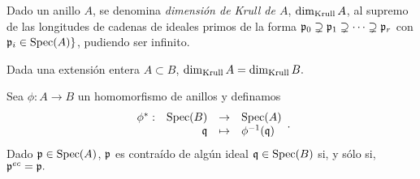 \documentclass[../main.tex]{subfiles}
\begin{document}
\begin{definition}
Dado un anillo $A$, se denomina \textit{dimensión de Krull de $A$},  $\dim_{\text{Krull}} A$, al supremo de las longitudes de cadenas de ideales primos de la forma $\mathfrak{p}_0\supsetneq\mathfrak{p}_1\supsetneq\cdots\supsetneq\mathfrak{p}_r$ con $\mathfrak{p}_i\in\text{Spec}(A)\}$, pudiendo ser infinito.
\end{definition}

\begin{corollary}
Dada una extensión entera $A\subset B$, $\dim_{\text{Krull}} A=\dim_{\text{Krull}} B.$
\end{corollary}

\begin{lemma}
Sea $\phi:A\rightarrow B$ un homomorfismo de anillos y definamos
$$\begin{array}{rrcl}
    \phi^*:&\text{Spec}(B)&\rightarrow&\text{Spec}(A)  \\
     &\mathfrak{q}&\mapsto&\phi^{-1}(\mathfrak{q})
\end{array}.$$
Dado $\mathfrak{p}\in\text{Spec}(A)$, $\mathfrak{p}$ es contraído de algún ideal $\mathfrak{q}\in\text{Spec}(B)$ si, y sólo si, $\mathfrak{p}^{ec}=\mathfrak{p}.$
\end{lemma}
\end{document}
